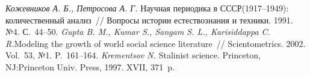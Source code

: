 \begin{thebibliography}{99}
 \textit{Кожевников А. Б., Петросова А. Г.} Научная периодика в СССР(1917--1949): количественный анализ~// Вопросы истории естествознания и техники. 1991. №4. С.~44--50.
 \textit{Gupta B. M., Kumar S., Sangam S. L., Karisiddappa C. R.}Modeling the growth of world social science literature~// Scientometrics. 2002. Vol.~53, №1. P.~161--164.
 \textit{Krementsov N.} Stalinist science. Princeton, NJ:Princeton Univ. Press, 1997. XVII, 371~p.
\end{thebibliography}